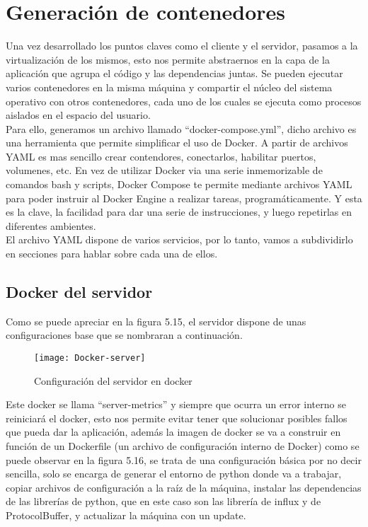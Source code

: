 \documentclass[ spanish, a4paper, 12pt, oneside]{report}
\begin{document}
\section{Generación de contenedores}
Una vez desarrollado los puntos claves como el cliente y el servidor, pasamos a la virtualización de los mismos, esto nos permite abstraernos en la capa de la aplicación que agrupa el código 
y las dependencias juntas. Se pueden ejecutar varios contenedores en la misma máquina y compartir el núcleo del sistema operativo con otros contenedores, cada uno de los cuales se ejecuta como 
procesos aislados en el espacio del usuario. \\

Para ello, generamos un archivo llamado ``docker-compose.yml'', dicho archivo es una herramienta que permite simplificar el uso de Docker. A partir de archivos YAML es mas sencillo crear contendores, 
conectarlos, habilitar puertos, volumenes, etc. En vez de utilizar Docker via una serie inmemorizable de comandos bash y scripts, Docker Compose te permite mediante archivos YAML para poder instruir al 
Docker Engine a realizar tareas, programáticamente. Y esta es la clave, la facilidad para dar una serie de instrucciones, y luego repetirlas en diferentes ambientes.\\

El archivo YAML dispone de varios servicios, por lo tanto, vamos a subdividirlo en secciones para hablar sobre cada una de ellos. 

\subsection{Docker del servidor}

Como se puede apreciar en la figura 5.15, el servidor dispone de unas configuraciones base que se nombraran a continuación.\\

\begin{figure}[!h]
   \centering
   \texttt{[image: Docker-server]}\\
      \caption{\label{fig: Configuración del servidor en docker} Configuración del servidor en docker}
\end{figure}

Este docker se llama ``server-metrics'' y siempre que ocurra un error interno se reiniciará el docker, esto nos permite evitar 
tener que solucionar posibles fallos que pueda dar la aplicación, además la imagen de docker se va a construir en función de un Dockerfile (un archivo de configuración interno de Docker) como se puede observar en la figura 5.16, se trata de una configuración básica 
por no decir sencilla, solo se encarga de generar el entorno de python donde va a trabajar, copiar archivos de configuración a la raíz de la máquina, instalar las dependencias de las librerías de python, que en este caso son las librería de influx y de ProtocolBuffer, y actualizar 
la máquina con un update. \\ 
\end{document}
